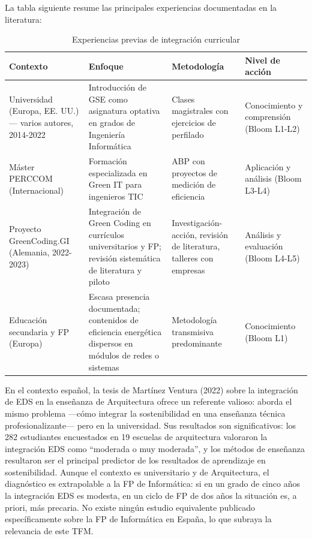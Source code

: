 La tabla siguiente resume las principales experiencias documentadas en la literatura:


\begin{table}[H]
\centering
\caption{Experiencias previas de integración curricular}
\label{tab:experiencias-previas-de-integracion-curricular}

\begin{tabularx}{\textwidth}{|X|X|X|X|}
\hline
\textbf{\textbf{Contexto}} & \textbf{\textbf{Enfoque}} & \textbf{\textbf{Metodología}} & \textbf{\textbf{Nivel de acción}} \\
\hline
Universidad (Europa, EE. UU.) — varios autores, 2014-2022 & Introducción de GSE como asignatura optativa en grados de Ingeniería Informática & Clases magistrales con ejercicios de perfilado & Conocimiento y comprensión (Bloom L1-L2) \\
\hline
Máster PERCCOM (Internacional) & Formación especializada en Green IT para ingenieros TIC & ABP con proyectos de medición de eficiencia & Aplicación y análisis (Bloom L3-L4) \\
\hline
Proyecto GreenCoding.GI (Alemania, 2022-2023) & Integración de Green Coding en currículos universitarios y FP; revisión sistemática de literatura y piloto & Investigación-acción, revisión de literatura, talleres con empresas & Análisis y evaluación (Bloom L4-L5) \\
\hline
Educación secundaria y FP (Europa) & Escasa presencia documentada; contenidos de eficiencia energética dispersos en módulos de redes o sistemas & Metodología transmisiva predominante & Conocimiento (Bloom L1) \\
\hline
\end{tabularx}

\end{table}


En el contexto español, la tesis de Martínez Ventura (2022) sobre la integración de EDS en la enseñanza de Arquitectura ofrece un referente valioso: aborda el mismo problema —cómo integrar la sostenibilidad en una enseñanza técnica profesionalizante— pero en la universidad. Sus resultados son significativos: los 282 estudiantes encuestados en 19 escuelas de arquitectura valoraron la integración EDS como ``moderada o muy moderada'', y los métodos de enseñanza resultaron ser el principal predictor de los resultados de aprendizaje en sostenibilidad. Aunque el contexto es universitario y de Arquitectura, el diagnóstico es extrapolable a la FP de Informática: si en un grado de cinco años la integración EDS es modesta, en un ciclo de FP de dos años la situación es, a priori, más precaria. No existe ningún estudio equivalente publicado específicamente sobre la FP de Informática en España, lo que subraya la relevancia de este TFM.


